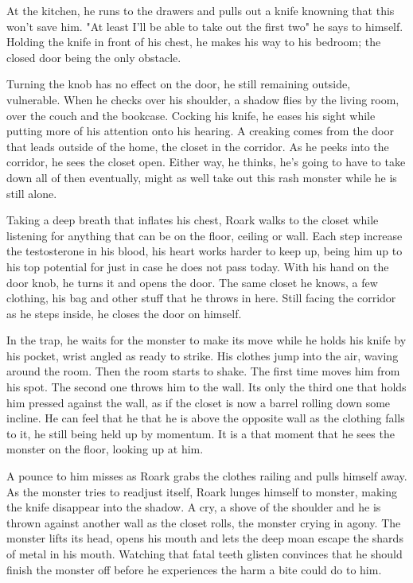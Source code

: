         At the kitchen, he runs to the drawers and pulls out a knife knowning that this won't save him. "At least I'll be able to take out the
    first two" he says to himself. Holding the knife in front of his chest, he makes his way to his bedroom; the closed door being the only
    obstacle.

        Turning the knob has no effect on the door, he still remaining outside, vulnerable. When he checks over his shoulder, a shadow flies by
    the living room, over the couch and the bookcase. Cocking his knife, he eases his sight while putting more of his attention onto his hearing.
    A creaking comes from the door that leads outside of the home, the closet in the corridor. As he peeks into the corridor, he sees the
    closet open. Either way, he thinks, he's going to have to take down all of then eventually, might as well take out this rash monster while
    he is still alone.

        Taking a deep breath that inflates his chest, Roark walks to the closet while listening for anything that can be on the floor, ceiling or
    wall. Each step increase the testosterone in his blood, his heart works harder to keep up, being him up to his top potential for just in
    case he does not pass today. With his hand on the door knob, he turns it and opens the door. The same closet he knows, a few clothing, his
    bag and other stuff that he throws in here. Still facing the corridor as he steps inside, he closes the door on himself.

        In the trap, he waits for the monster to make its move while he holds his knife by his pocket, wrist angled as ready to strike. His
    clothes jump into the air, waving around the room. Then the room starts to shake. The first time moves him from his spot. The second one
    throws him to the wall. Its only the third one that holds him pressed against the wall, as if the closet is now a barrel rolling down
    some incline. He can feel that he that he is above the opposite wall as the clothing falls to it, he still being held up by momentum. It is
    a that moment that he sees the monster on the floor, looking up at him.

        A pounce to him misses as Roark grabs the clothes railing and pulls himself away. As the monster tries to readjust itself, Roark lunges 
    himself to monster, making the knife disappear into the shadow. A cry, a shove of the shoulder and he is thrown against another wall as
    the closet rolls, the monster crying in agony. The monster lifts its head, opens his mouth and lets the deep moan escape the shards of metal
    in his mouth. Watching that fatal teeth glisten convinces that he should finish the monster off before he experiences the harm a bite could
    do to him.

